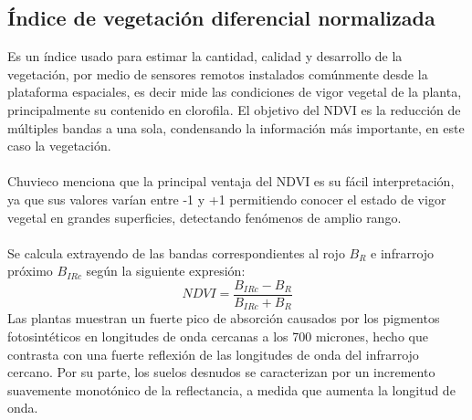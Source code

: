 \subsection{\'Indice de vegetaci\'on diferencial normalizada}\label{subsec:ndvi}
Es un \'indice usado para estimar la cantidad, calidad y desarrollo de la vegetaci\'on, por medio de sensores remotos instalados com\'unmente desde la plataforma espaciales, es decir mide las condiciones de vigor vegetal de la planta, principalmente su contenido en clorofila\cite{salinero2002teledeteccion}. El objetivo del NDVI es la reducci\'on de m\'ultiples bandas a una sola, condensando la informaci\'on m\'as importante, en este caso la vegetaci\'on.\\~\\
Chuvieco\cite{salinero2002teledeteccion} menciona que la principal ventaja del NDVI es su f\'acil interpretaci\'on, ya que sus
valores var\'ian entre -1 y +1 permitiendo conocer el estado de vigor vegetal en grandes superficies, detectando fen\'omenos de amplio rango.\\~\\
Se calcula extrayendo de las bandas correspondientes al rojo $B_{R}$ e infrarrojo pr\'oximo $B_{IRc}$ seg\'un la siguiente expresi\'on:
	\begin{equation}
	\label{e:ndvi}
	NDVI=\dfrac{B_{IRc}-B_{R}}{B_{IRc}+B_{R}}
	\end{equation}
Las plantas muestran un fuerte pico de absorci\'on causados por los pigmentos fotosint\'eticos en longitudes de onda cercanas a los 700 micrones, hecho que contrasta con una fuerte reflexi\'on de las longitudes de onda del infrarrojo cercano. Por su parte, los suelos desnudos se caracterizan por un incremento suavemente monot\'onico de la reflectancia, a medida que aumenta la longitud de onda.

